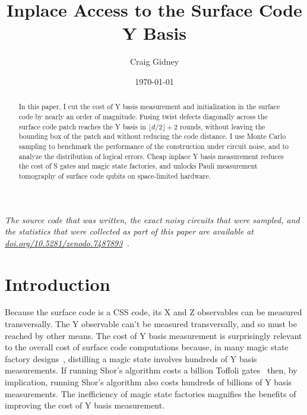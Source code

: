 \documentclass[onecolumn,unpublished,a4paper]{quantumarticle}
\theoremstyle{definition}
\theoremstyle{definition}
\theoremstyle{definition}
\begin{document}
\title{Inplace Access to the Surface Code Y Basis}

\date{\today}
\author{Craig Gidney}

\begin{abstract}
In this paper, I cut the cost of Y basis measurement and initialization in the surface code by nearly an order of magnitude.
Fusing twist defects diagonally across the surface code patch reaches the Y basis in $\lfloor d/2 \rfloor + 2$ rounds, without leaving the bounding box of the patch and without reducing the code distance.
I use Monte Carlo sampling to benchmark the performance of the construction under circuit noise, and to analyze the distribution of logical errors.
Cheap inplace Y basis measurement reduces the cost of S gates and magic state factories, and unlocks Pauli measurement tomography of surface code qubits on space-limited hardware.
\end{abstract}

\emph{The source code that was written, the exact noisy circuits that were sampled, and the statistics that were collected as part of this paper are available at \href{https://doi.org/10.5281/zenodo.7487893}{doi.org/10.5281/zenodo.7487893}~\cite{gidneyybasisdata2022}.}

\maketitle

\section{Introduction}
\label{sec:introduction}

Because the surface code is a CSS code, its X and Z observables can be measured transversally.
The Y observable can't be measured transversally, and so must be reached by other means.
The cost of Y basis measurement is surprisingly relevant to the overall cost of surface code computations because, in many magic state factory designs~\cite{fowler2018latticesurgery,gidney2019catalyzeddistillation,litinski2018}, distilling a magic state involves hundreds of Y basis measurements.
If running Shor's algorithm costs a billion Toffoli gates~\cite{gidney2021factor,soeken2020improved} then, by implication, running Shor's algorithm also costs hundreds of billions of Y basis measurements.
The inefficiency of magic state factories magnifies the benefits of improving the cost of Y basis measurement.
\end{document}
